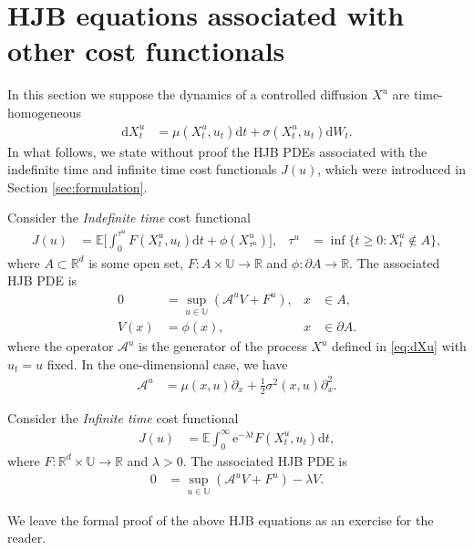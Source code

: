 \documentclass[12pt]{book}
\let\varphi\phi
\numberwithin{equation}{chapter}
\theoremstyle{plain}
\numberwithin{theorem}{section}
\theoremstyle{definition}
\numberwithin{exercise}{chapter}
\newcommand{\<}{\langle}
\renewcommand{\>}{\rangle}
\renewcommand{\(}{\left(}
\renewcommand{\)}{\right)}
\renewcommand{\[}{\left[}
\renewcommand{\]}{\right]}
\newcommand\Eb{\mathds{E}}
\newcommand\Rb{\mathds{R}}
\newcommand\Ub{\mathds{U}}
\newcommand\Ac{\mathscr{A}}
\newcommand\sig{\sigma}
\newcommand\lam{\lambda}
\renewcommand\d{\partial}
\newcommand\dd{\mathrm{d}}
\newcommand\ee{\mathrm{e}}
\begin{document}
\section{HJB equations associated with other cost functionals}
\label{sec:other-HJB}
In this section we suppose the dynamics of a controlled diffusion $X^u$ are time-homogeneous
\begin{align}
\dd X_t^u
	&=	\mu( X_t^u, u_t) \dd t + \sig(X_t^u, u_t) \dd W_t . \label{eq:dXu}
\end{align}
In what follows, we state without proof the HJB PDEs associated with  the indefinite time and infinite time cost functionals $J(u)$, which were introduced in Section \ref{sec:formulation}.
\begin{enumerate*}
\item Consider the \emph{Indefinite time} cost functional
\begin{align}
J(u)
	&=	\Eb \Big[ \int_0^{\tau^u} F(X_t^u,u_t) \dd t +  \varphi(X_{\tau^u}^u) \Big], &
\tau^u
	&=	\inf\{ t \geq 0 : X_t^u \notin A \} ,
\end{align}
where $A \subset \Rb^d$ is some open set, $F: A \times \Ub \to \Rb$ and $\varphi : \d A \to \Rb$.
The associated HJB PDE is
\begin{align}
0
	&=	\sup_{u \in \Ub} ( \Ac^u V + F^u ) , &
x
	&\in A , \label{eq:HJB-indefinite-time} \\
V(x)
	&=	\varphi(x) , &
x
	&\in \d A .
\end{align}
where the operator $\Ac^u$ is the generator of the process $X^u$ defined in \eqref{eq:dXu} with $u_t = u$ fixed.  In the one-dimensional case, we have
\begin{align}
\Ac^u
	&=	\mu(x,u)\d_x + \tfrac{1}{2} \sig^2(x,u) \d_x^2 .
\end{align}
\item Consider the \emph{Infinite time} cost functional
\begin{align}
J(u)
	&=	\Eb \int_0^\infty \ee^{- \lam t} F(X_t^u,u_t) \dd t ,
\end{align}
where $F : \Rb^d \times \Ub \to \Rb$ and $\lam > 0$.
The associated HJB PDE is
\begin{align}
0
	&=	\sup_{u \in \Ub} ( \Ac^u V  +  F^u ) - \lam V . \label{eq:HJB-infinite-time}
\end{align}
\end{enumerate*}
We leave the formal proof of the above HJB equations as an exercise for the reader.

\end{document}
